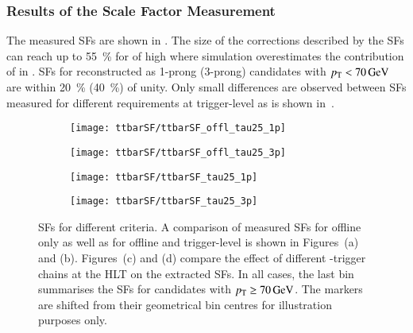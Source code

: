 \subsubsection{Results of the Scale Factor Measurement}

The measured \faketauhadvis SFs are shown in .
The size of the corrections described by the SFs can reach up to
\SI{55}{\percent} for \faketauhadvis of high \pT where simulation overestimates
the contribution of \faketauhadvis in \ttbar. SFs for \faketauhadvis
reconstructed as 1-prong (3-prong) candidates with $\pT < \SI{70}{\GeV}$ are
within \SI{20}{\percent} (\SI{40}{\percent}) of unity. Only small differences
are observed between SFs measured for different \tauid requirements at
trigger-level as is shown
in~.

\begin{figure}[htbp]
  \centering

  \begin{subfigure}[t]{.495\textwidth}
    \texttt{[image: ttbarSF/ttbarSF\_offl\_tau25\_1p]}
    \caption{}
    \label{fig:ttbarSF_postfit_SF_a}
  \end{subfigure}\hfill%
  \begin{subfigure}[t]{.495\textwidth}
    \texttt{[image: ttbarSF/ttbarSF\_offl\_tau25\_3p]}
    \caption{}
    \label{fig:ttbarSF_postfit_SF_b}
  \end{subfigure}

  \begin{subfigure}[t]{.495\textwidth}
    \texttt{[image: ttbarSF/ttbarSF\_tau25\_1p]}
    \caption{}
    \label{fig:ttbarSF_postfit_SF_c}
  \end{subfigure}\hfill%
  \begin{subfigure}[t]{.495\textwidth}
    \texttt{[image: ttbarSF/ttbarSF\_tau25\_3p]}
    \caption{}
    \label{fig:ttbarSF_postfit_SF_d}
  \end{subfigure}

  \caption[\Faketauhadvis SFs for different \tauid criteria.]{\Faketauhadvis SFs
    for different \tauid criteria. A comparison of measured \faketauhadvis SFs
    for offline \tauid only as well as for offline and trigger-level \tauid is
    shown in Figures~(a) and (b). Figures~(c) and (d) compare the effect of
    different \tauhadvis-trigger chains at the HLT on the extracted SFs. In all
    cases, the last bin summarises the SFs for \tauhadvis candidates with
    $\pT \geq \SI{70}{\GeV}$. The markers are shifted from their geometrical bin
    centres for illustration purposes only.}%
  \label{fig:ttbarSF_postfit_SF}
\end{figure}

